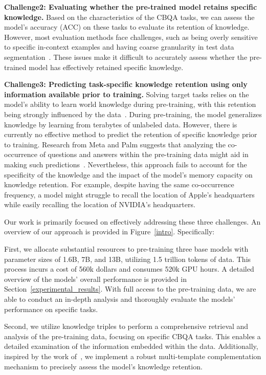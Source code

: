 \textbf{Challenge2: Evaluating whether the pre-trained model retains specific knowledge.} Based on the characteristics of the CBQA tasks, we can assess the model’s accuracy (ACC) on these tasks to evaluate its retention of knowledge. However, most evaluation methods face challenges, such as being overly sensitive to specific in-context examples and having coarse granularity in test data segmentation~\cite{DBLP:conf/emnlp/MinLHALHZ22, DBLP:conf/acl/SrivastavaGD024}. These issues make it difficult to accurately assess whether the pre-trained model has effectively retained specific knowledge.

\textbf{Challenge3: Predicting task-specific knowledge retention using only information available prior to training.} Solving target tasks relies on the model’s ability to learn world knowledge during pre-training, with this retention being strongly influenced by the data~\cite{DBLP:conf/icml/Allen-ZhuL24, DBLP:conf/emnlp/WangYXQD00GJX0C24}. During pre-training, the model generalizes knowledge by learning from terabytes of unlabeled data. However, there is currently no effective method to predict the retention of specific knowledge prior to training. Research from Meta and Palm suggests that analyzing the co-occurrence of questions and answers within the pre-training data might aid in making such predictions~\cite{DBLP:journals/corr/abs-2404-05405, DBLP:journals/jmlr/ChowdheryNDBMRBCSGSSTMRBTSPRDHPBAI23}. Nevertheless, this approach fails to account for the specificity of the knowledge and the impact of the model’s memory capacity on knowledge retention. For example, despite having the same co-occurrence frequency, a model might struggle to recall the location of Apple’s headquarters while easily recalling the location of NVIDIA’s headquarters.

Our work is primarily focused on effectively addressing these three challenges. An overview of our approach is provided in Figure~\ref{intro}. Specifically:

First, we allocate substantial resources to pre-training three base models with parameter sizes of 1.6B, 7B, and 13B, utilizing 1.5 trillion tokens of data. This process incurs a cost of 560k dollars and consumes 520k GPU hours. A detailed overview of the models’ overall performance is provided in Section~\ref{experimental_results}. With full access to the pre-training data, we are able to conduct an in-depth analysis and thoroughly evaluate the models’ performance on specific tasks.

Second, we utilize knowledge triples to perform a comprehensive retrieval and analysis of the pre-training data, focusing on specific CBQA tasks. This enables a detailed examination of the information embedded within the data. Additionally, inspired by the work of~\citet{DBLP:journals/corr/abs-2409-15825}, we implement a robust multi-template complementation mechanism to precisely assess the model’s knowledge retention.

